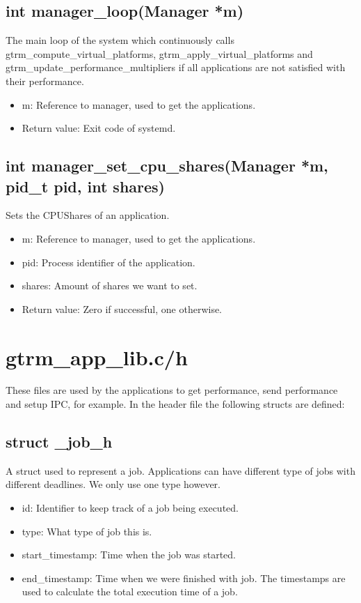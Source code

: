 \documentclass[nobiblatex]{LTHthesis}
\begin{document}
\subsection{int manager\_loop(Manager *m)}
The main loop of the system which continuously calls gtrm\_compute\_virtual\_platforms, gtrm\_apply\_virtual\_platforms and gtrm\_update\_performance\_multipliers if all applications are not satisfied with their performance.
\begin{itemize}
\item m: Reference to manager, used to get the applications.
\item Return value: Exit code of systemd.
\end{itemize}

\subsection{int manager\_set\_cpu\_shares(Manager *m, pid\_t pid, int shares)}
Sets the CPUShares of an application.
\begin{itemize}
\item m: Reference to manager, used to get the applications.
\item pid: Process identifier of the application.
\item shares: Amount of shares we want to set.
\item Return value: Zero if successful, one otherwise.
\end{itemize}

\section{gtrm\_app\_lib.c/h}
These files are used by the applications to get performance, send performance and setup IPC, for example.
In the header file the following structs are defined:
\subsection{struct \_job\_h}
A struct used to represent a job. Applications can have different type of jobs with different deadlines. We only use one type however.
\begin{itemize}
\item id: Identifier to keep track of a job being executed.
\item type: What type of job this is.
\item start\_timestamp: Time when the job was started.
\item end\_timestamp: Time when we were finished with job. The timestamps are used to calculate the total execution time of a job.
\end{itemize}
\end{document}
